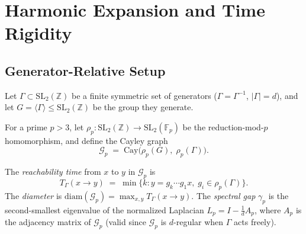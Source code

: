 %
%


\section{Harmonic Expansion and Time Rigidity}
\label{sec:harmonic}

\subsection{Generator-Relative Setup}
\label{sec:harmonic:setup}

Let $\Gamma \subset \mathrm{SL}_2(\mathbb{Z})$ be a finite symmetric set of generators
($\Gamma = \Gamma^{-1}$, $|\Gamma| = d$),
and let $G = \langle \Gamma \rangle \leq \mathrm{SL}_2(\mathbb{Z})$ be the group they generate.

For a prime $p > 3$, let $\rho_p \colon \mathrm{SL}_2(\mathbb{Z}) \to \mathrm{SL}_2(\mathbb{F}_p)$
be the reduction-mod-$p$ homomorphism, and define the Cayley graph
\[
  \mathcal{G}_p \;=\; \mathrm{Cay}\!\bigl(\rho_p(G),\;\rho_p(\Gamma)\bigr).
\]

\begin{definition}
  \label{def:time_gap}
  The \emph{reachability time} from $x$ to $y$ in $\mathcal{G}_p$ is
  \[
    T_\Gamma(x \to y) \;=\; \min\bigl\{ k : y = g_k \cdots g_1 x,\; g_i \in \rho_p(\Gamma) \bigr\}.
  \]
  The \emph{diameter} is $\mathrm{diam}(\mathcal{G}_p) = \max_{x,y} T_\Gamma(x \to y)$.
  The \emph{spectral gap} $\gamma_p$ is the second-smallest eigenvalue of the
  normalized Laplacian $L_p = I - \frac{1}{d}A_p$, where $A_p$ is the adjacency matrix
  of $\mathcal{G}_p$ (valid since $\mathcal{G}_p$ is $d$-regular when $\Gamma$ acts freely).
\end{definition}

